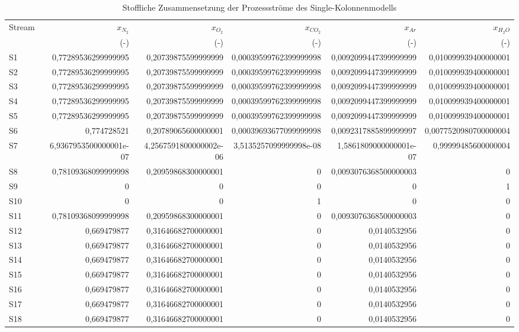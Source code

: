 \begin{longtable}{lrrrrr}
\caption{Stoffliche Zusammensetzung der Prozessströme des Single-Kolonnenmodells} \\
\hline
Stream & $x_{N_2}$ & $x_{O_2}$ & $x_{CO_2}$ & $x_{Ar}$ & $x_{H_2O}$ \\
 & (-) & (-) & (-) & (-) & (-) \\
\hline
S1 & 0,77289536299999995 & 0,20739875599999999 & 0,00039599762399999998 & 0,0092099447399999999 & 0,010099939400000001 \\
S2 & 0,77289536299999995 & 0,20739875599999999 & 0,00039599762399999998 & 0,0092099447399999999 & 0,010099939400000001 \\
S3 & 0,77289536299999995 & 0,20739875599999999 & 0,00039599762399999998 & 0,0092099447399999999 & 0,010099939400000001 \\
S4 & 0,77289536299999995 & 0,20739875599999999 & 0,00039599762399999998 & 0,0092099447399999999 & 0,010099939400000001 \\
S5 & 0,77289536299999995 & 0,20739875599999999 & 0,00039599762399999998 & 0,0092099447399999999 & 0,010099939400000001 \\
S6 & 0,774728521 & 0,20789065600000001 & 0,00039693677099999998 & 0,0092317885899999997 & 0,0077520980700000004 \\
S7 & 6,9367953500000001e-07 & 4,2567591800000002e-06 & 3,5135257099999998e-08 & 1,5861809000000001e-07 & 0,99999485600000004 \\
S8 & 0,78109368099999998 & 0,20959868300000001 & 0 & 0,0093076368500000003 & 0 \\
S9 & 0 & 0 & 0 & 0 & 1 \\
S10 & 0 & 0 & 1 & 0 & 0 \\
S11 & 0,78109368099999998 & 0,20959868300000001 & 0 & 0,0093076368500000003 & 0 \\
S12 & 0,669479877 & 0,31646682700000001 & 0 & 0,0140532956 & 0 \\
S13 & 0,669479877 & 0,31646682700000001 & 0 & 0,0140532956 & 0 \\
S14 & 0,669479877 & 0,31646682700000001 & 0 & 0,0140532956 & 0 \\
S15 & 0,669479877 & 0,31646682700000001 & 0 & 0,0140532956 & 0 \\
S16 & 0,669479877 & 0,31646682700000001 & 0 & 0,0140532956 & 0 \\
S17 & 0,669479877 & 0,31646682700000001 & 0 & 0,0140532956 & 0 \\
S18 & 0,669479877 & 0,31646682700000001 & 0 & 0,0140532956 & 0 \\

\end{longtable}
